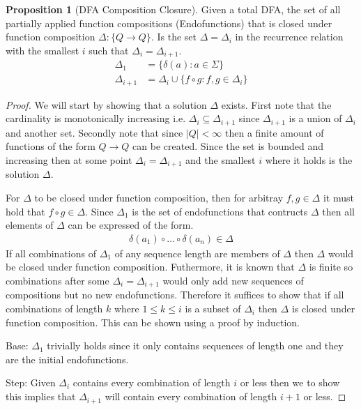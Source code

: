 \documentclass[a4paper,12pt]{article}
\theoremstyle{definition}
\newtheorem{proposition}{Proposition}[section]
\begin{document}
\begin{proposition}[DFA Composition Closure]
  Given a total DFA, the set of all partially applied function compositions (Endofunctions) that is closed under function composition $\Delta: \{Q \to Q\}$. Is the set $\Delta = \Delta_i$ in the recurrence relation with the smallest $i$ such that $\Delta_i = \Delta_{i + 1}$.
  \begin{align*}
    \Delta_1 &= \{\delta(a) : a \in \Sigma \} \\
    \Delta_{i + 1} &= \Delta_i \cup \{f \circ g : f, g \in \Delta_i\}
  \end{align*}
\end{proposition}
\begin{proof}
  We will start by showing that a solution $\Delta$ exists. First note that the cardinality is monotonically increasing i.e. $\Delta_i \subseteq \Delta_{i + 1}$ since $\Delta_{i + 1}$ is a union of $\Delta_i$ and another set. Secondly note that since $|Q| < \infty$ then a finite amount of functions of the form $Q \to Q$ can be created. Since the set is bounded and increasing then at some point $\Delta_i = \Delta_{i + 1}$ and the smallest $i$ where it holds is the solution $\Delta$.

  For $\Delta$ to be closed under function composition, then for arbitray $f, g \in \Delta$ it must hold that $f \circ g \in \Delta$. Since $\Delta_1$ is the set of endofunctions that contructs $\Delta$ then all elements of $\Delta$ can be expressed of the form.
  \begin{align*}
    \delta(a_1) \circ \dots \circ \delta(a_n) \in \Delta
  \end{align*}
  If all combinations of $\Delta_1$ of any sequence length are members of $\Delta$ then $\Delta$ would be closed under function composition. Futhermore, it is known that $\Delta$ is finite so combinations after some $\Delta_i = \Delta_{i + 1}$ would only add new sequences of compositions but no new endofunctions. Therefore it suffices to show that if all combinations of length $k$ where $1 \leq k \leq i$ is a subset of $\Delta_i$ then $\Delta$ is closed under function composition. This can be shown using a proof by induction.

  Base: $\Delta_1$ trivially holds since it only contains sequences of length one and they are the initial endofunctions.

  Step: Given $\Delta_i$ contains every combination of length $i$ or less then we to show this implies that $\Delta_{i + 1}$ will contain every combination of length $i + 1$ or less.


\end{proof}
\end{document}
